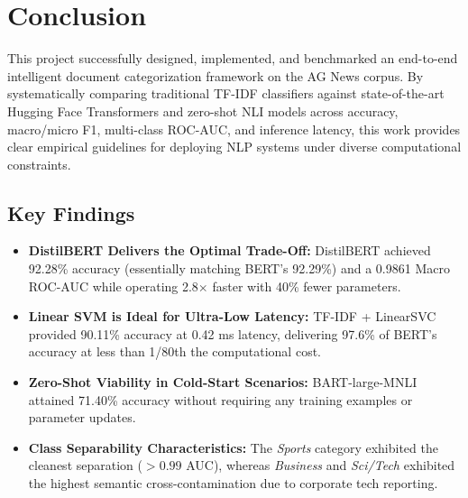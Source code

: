 \documentclass[12pt, a4paper]{article}
\begin{document}
\section{Conclusion}

This project successfully designed, implemented, and benchmarked an end-to-end intelligent document categorization framework on the AG News corpus. By systematically comparing traditional TF-IDF classifiers against state-of-the-art Hugging Face Transformers and zero-shot NLI models across accuracy, macro/micro F1, multi-class ROC-AUC, and inference latency, this work provides clear empirical guidelines for deploying NLP systems under diverse computational constraints.

\subsection{Key Findings}
\begin{itemize}
    \item \textbf{DistilBERT Delivers the Optimal Trade-Off:} DistilBERT achieved 92.28\% accuracy (essentially matching BERT's 92.29\%) and a 0.9861 Macro ROC-AUC while operating 2.8$\times$ faster with 40\% fewer parameters.
    \item \textbf{Linear SVM is Ideal for Ultra-Low Latency:} TF-IDF + LinearSVC provided 90.11\% accuracy at 0.42 ms latency, delivering 97.6\% of BERT's accuracy at less than 1/80th the computational cost.
    \item \textbf{Zero-Shot Viability in Cold-Start Scenarios:} BART-large-MNLI attained 71.40\% accuracy without requiring any training examples or parameter updates.
    \item \textbf{Class Separability Characteristics:} The \textit{Sports} category exhibited the cleanest separation ($>0.99$ AUC), whereas \textit{Business} and \textit{Sci/Tech} exhibited the highest semantic cross-contamination due to corporate tech reporting.
\end{itemize}
\end{document}
